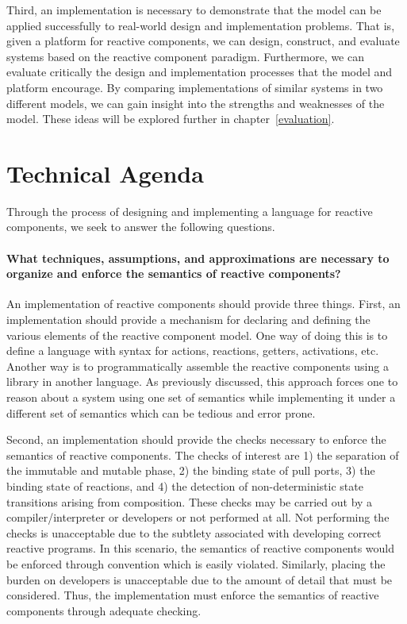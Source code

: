 Third, an implementation is necessary to demonstrate that the model can be applied successfully to real-world design and implementation problems.
That is, given a platform for reactive components, we can design, construct, and evaluate systems based on the reactive component paradigm.
Furthermore, we can evaluate critically the design and implementation processes that the model and platform encourage.
By comparing implementations of similar systems in two different models, we can gain insight into the strengths and weaknesses of the model.
These ideas will be explored further in chapter~\ref{evaluation}.

\section{Technical Agenda}

Through the process of designing and implementing a language for reactive components, we seek to answer the following questions.

\paragraph{What techniques, assumptions, and approximations are necessary to organize and enforce the semantics of reactive components?}
An implementation of reactive components should provide three things.
First, an implementation should provide a mechanism for declaring and defining the various elements of the reactive component model.
One way of doing this is to define a language with syntax for actions, reactions, getters, activations, etc.
Another way is to programmatically assemble the reactive components using a library in another language.
As previously discussed, this approach forces one to reason about a system using one set of semantics while implementing it under a different set of semantics which can be tedious and error prone.

Second, an implementation should provide the checks necessary to enforce the semantics of reactive components.
The checks of interest are 1) the separation of the immutable and mutable phase, 2) the binding state of pull ports, 3) the binding state of reactions, and 4) the detection of non-deterministic state transitions arising from composition.
These checks may be carried out by a compiler/interpreter or developers or not performed at all.
Not performing the checks is unacceptable due to the subtlety associated with developing correct reactive programs.
In this scenario, the semantics of reactive components would be enforced through convention which is easily violated.
Similarly, placing the burden on developers is unacceptable due to the amount of detail that must be considered.
Thus, the implementation must enforce the semantics of reactive components through adequate checking.

